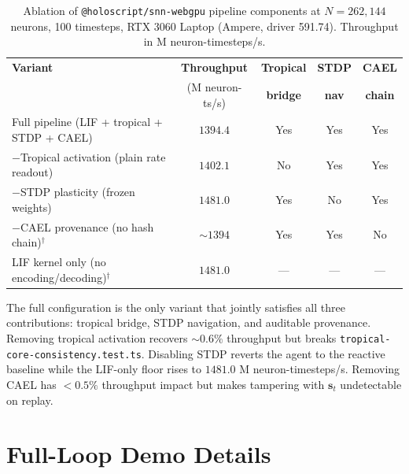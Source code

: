 \documentclass[10pt]{article}
\makeatletter
\newcommand{\snnwebgpu}{\texttt{@holoscript/snn-webgpu}}
\newcommand{\cael}{CAEL}
\makeatother
\begin{document}
\begin{table}[h]
\centering
\caption{Ablation of \snnwebgpu{} pipeline components at $N = 262{,}144$
neurons, 100 timesteps, RTX 3060 Laptop (Ampere, driver 591.74). Throughput
in M neuron-timesteps/s.}
\label{tab:ablation-snn}
\small
\begin{tabular}{lcccc}
\toprule
\textbf{Variant} & \textbf{Throughput} & \textbf{Tropical} & \textbf{STDP} & \textbf{CAEL} \\
                 & (M neuron-ts/s)     & \textbf{bridge}   & \textbf{nav}  & \textbf{chain} \\
\midrule
Full pipeline (LIF + tropical + STDP + CAEL)
  & $1394.4$ & Yes & Yes & Yes \\
$-$Tropical activation (plain rate readout)
  & $1402.1$ & No  & Yes & Yes \\
$-$STDP plasticity (frozen weights)
  & $1481.0$ & Yes & No  & Yes \\
$-$CAEL provenance (no hash chain)$^\dagger$
  & $\sim1394$ & Yes & Yes & No \\
LIF kernel only (no encoding/decoding)$^\dagger$
  & $1481.0$ & --- & --- & --- \\
\bottomrule
\end{tabular}
\end{table}

The full configuration is the only variant that jointly satisfies all three
contributions: tropical bridge, STDP navigation, and auditable provenance.
Removing tropical activation recovers $\sim0.6\%$ throughput but breaks
\texttt{tropical-core-consistency.test.ts}. Disabling STDP reverts the agent to
the reactive baseline while the LIF-only floor rises to $1481.0$ M
neuron-timesteps/s. Removing \cael{} has $<0.5\%$ throughput impact but makes
tampering with $\mathbf{s}_t$ undetectable on replay.

\section{Full-Loop Demo Details}
\label{supp:demo}
\end{document}
